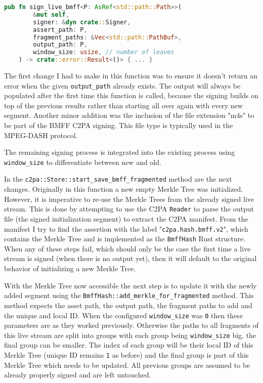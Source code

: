 \begin{minipage}{0.95\linewidth}
\begin{lstlisting}[caption={New Live Signing Function}, label=code:live_sign, language=Rust, captionpos=b]
    pub fn sign_live_bmff<P: AsRef<std::path::Path>>(
        &mut self,
        signer: &dyn crate::Signer,
        assert_path: P,
        fragment_paths: &Vec<std::path::PathBuf>,
        output_path: P,
        window_size: usize, // number of leaves
    ) -> crate::error::Result<()> { ... }
\end{lstlisting}
\end{minipage}

The first change I had to make in this function was to ensure it doesn't return an error when the given \texttt{output\_path} already exists. The output will always be populated after the first time this function is called, because the signing builds on top of the previous results rather than starting all over again with every new segment. Another minor addition was the inclusion of the file extension "m4s" to be part of the BMFF C2PA signing. This file type is typically used in the MPEG-DASH protocol.

The remaining signing process is integrated into the existing process using \texttt{window\_size} to differentiate between new and old.

In the \texttt{c2pa::Store::start\_save\_bmff\_fragmented} method are the next changes. Originally in this function a new empty Merkle Tree was initialized. However, it is imperative to re-use the Merkle Trees from the already signed live stream. This is done by attempting to use the C2PA \texttt{Reader} to parse the output file (the signed initialization segment) to extract the C2PA manifest. From the manifest I try to find the assertion with the label "\texttt{c2pa.hash.bmff.v2}", which contains the Merkle Tree and is implemented as the \texttt{BmffHash} Rust structure. When any of these steps fail, which should only be the case the first time a live stream is signed (when there is no output yet), then it will default to the original behavior of initializing a new Merkle Tree.

With the Merkle Tree now accessible the next step is to update it with the newly added segment using the \texttt{BmffHash::add\_merkle\_for\_fragmented} method. This method expects the asset path, the output path, the fragment paths to add and the unique and local ID. When the configured \texttt{window\_size} was \texttt{0} then these parameters are as they worked previously. Otherwise the paths to all fragments of this live stream are split into groups with each group being \texttt{window\_size} big, the final group can be smaller. The index of each group will be their local ID of this Merkle Tree (unique ID remains \texttt{1} as before) and the final group is part of this Merkle Tree which needs to be updated. All previous groups are assumed to be already properly signed and are left untouched.

